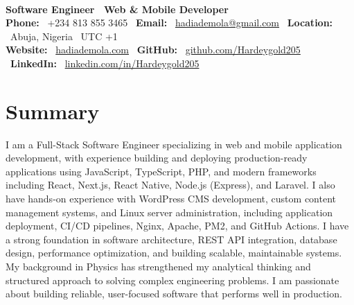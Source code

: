 \documentclass{article}
\newcommand{\resumename}[1]{{\textls[50]{\fontsize{24pt}{24pt}\selectfont\textbf{#1}}}}
\newcommand{\jobtitle}[1]{{\fontsize{14pt}{13.5pt}\selectfont\textbf{#1}}}
\newcommand{\contactinfo}[1]{{\fontsize{11pt}{13pt}\selectfont\color{black!70}#1}}
\begin{document}
\begin{center}
    \resumename{Hadi Ademola Surajudeen} \\[0.1cm]
    \jobtitle{Software Engineer \textbar\ Web \& Mobile Developer} \\[0.1cm]
    \contactinfo{
        \textbf{Phone:} \ +234 813 855 3465 \textbar\ 
        \textbf{Email:} \ \href{mailto:hadiademola@gmail.com}{hadiademola@gmail.com} \textbar\ 
        \textbf{Location:} \ Abuja, Nigeria \textbar\ UTC +1
    } \\[0.1cm]
    \contactinfo{
        \textbf{Website:} \ \href{https://hadiademola.vercel.app}{hadiademola.com} \textbar\
        \textbf{GitHub:} \ \href{https://github.com/Hardeygold205}{github.com/Hardeygold205} \textbar\ 
        \textbf{LinkedIn:} \ \href{https://linkedin.com/in/Hardeygold205}{linkedin.com/in/Hardeygold205}
    }
\end{center}

\vspace{-0.1cm}

\section{Summary}
I am a Full-Stack Software Engineer specializing in web and mobile application development, with experience building and deploying production-ready applications using JavaScript, TypeScript, PHP, and modern frameworks including React, Next.js, React Native, Node.js (Express), and Laravel. I also have hands-on experience with WordPress CMS development, custom content management systems, and Linux server administration, including application deployment, CI/CD pipelines, Nginx, Apache, PM2, and GitHub Actions. I have a strong foundation in software architecture, REST API integration, database design, performance optimization, and building scalable, maintainable systems. My background in Physics has strengthened my analytical thinking and structured approach to solving complex engineering problems. I am passionate about building reliable, user-focused software that performs well in production.

\vspace{0.1cm}
\end{document}

